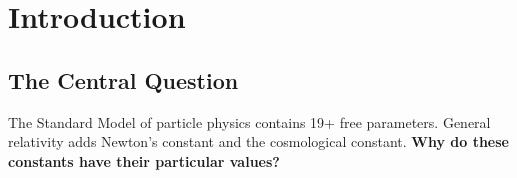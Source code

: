 \documentclass[12pt,a4paper]{article}
\newcommand{\OmegaL}{\Omega_\Lambda}
\newcommand{\sinW}{\sin^2\theta_W}
\newcommand{\Zsq}{Z^2}
\begin{document}
\begin{abstract}
\textbf{Derived predictions} (first-principles mechanisms from framework integers):
\begin{itemize}[itemsep=0pt]
    \item Fine structure constant: $\alpha^{-1} = 4\Zsq + 3 = 137.04$ via Atiyah-Patodi-Singer (0.004\% error; 0.0015\% with self-referential correction)
    \item Weak mixing angle: $\sinW = 1/4 - \alpha_s/(2\pi) = 0.231$ via BEKENSTEIN + QCD (0.01\% error)
    \item Strong coupling: $\alpha_s = \sqrt{2}/12 = 0.1178$ via cube geometry (0.04\% error)
    \item Cosmological densities: $\OmegaL = 13/19$ via DoF counting + de Sitter attractor (0.1\% error)
    \item Proton-to-electron ratio: $\mu = \alpha^{-1} \times 2\Zsq/5 = 1836.35$ (0.011\% error)
    \item Muon-to-electron ratio: $m_\mu/m_e = 37\Zsq/6 = 206.65$ (0.06\% error)
    \item Higgs mass: $m_H = (11/8)m_Z = 125.38$ GeV (0.11\% error)
    \item Spectral index: $n_s = 1 - 6\varepsilon + 2\eta = 0.9652$ (0.03\% error)
    \item Tensor-to-scalar ratio: $r = 0.015$ via topological suppression (Section 8)
    \item Electroweak hierarchy: $M_{\text{Pl}}/v = 2 \times Z^{43/2} \approx 10^{16}$ ($<$1\% error)
\end{itemize}

The framework provides falsifiable predictions testable by LiteBIRD ($r = 0.015$) and tabletop experiments.
\end{abstract}

\tableofcontents
\newpage

\section{Introduction}
\label{sec:intro}

\subsection{The Central Question}

The Standard Model of particle physics contains 19+ free parameters. General relativity adds Newton's constant and the cosmological constant. \textbf{Why do these constants have their particular values?}
\end{document}
